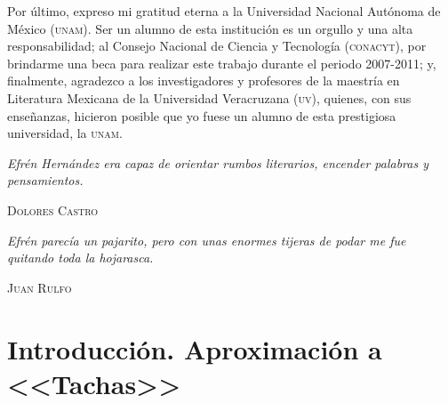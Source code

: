 \documentclass[14pt,twoside,final]{extbook} %
\begin{document}
Por último, expreso mi gratitud eterna a la Universidad Nacional Autónoma de México (\textsc{unam}). Ser un alumno de esta institución es un orgullo y una alta responsabilidad; al Consejo Nacional de Ciencia y Tecnología (\textsc{conacyt}), por brindarme una beca para realizar este trabajo durante el periodo 2007-2011; y, finalmente, agradezco a los investigadores y profesores de la maestría en Literatura Mexicana de la Universidad Veracruzana (\textsc{uv}), quienes, con sus enseñanzas, hicieron posible que yo fuese un alumno de esta prestigiosa universidad, la \textsc{unam}.
\makeatletter
\renewcommand\@dotsep{200}
\makeatother
\renewcommand{\contentsname}{Contenidos}
\tableofcontents
{}
\thispagestyle{empty}
\pagestyle{fancy}
\fancyhf{} %
\fancyhead[RO,LE]{\thepage}
\fancyfoot{}
\renewcommand{\headrulewidth}{0pt}
\setcounter{page}{7}
\newpage
\pagestyle{empty}
\null\vfill
\newpage
\pagestyle{empty}
\vspace*{42pt}
\begin{flushright}
\begin{minipage}{7.5cm} %
\emph{Efrén Hernández era capaz de orientar rumbos literarios, encender palabras y pensamientos.}
\begin{flushright}
\textsc{Dolores Castro}
\end{flushright}
\vspace*{28pt}
\emph{Efrén parecía un pajarito, pero con unas enormes tijeras de podar me fue quitando toda la hojarasca.}
\begin{flushright}
\textsc{Juan Rulfo}
\end{flushright}
\end{minipage}
\end{flushright}
\chapter*{Introducción. Aproximación a <<Tachas>>}\label{ch:introduccion-aproximacion-a-tachas}
\thispagestyle{empty}
\pagestyle{fancy}
\fancyhf{} %
\fancyhead[RO,LE]{\thepage}
\renewcommand{\headrulewidth}{0.4pt}
\setcounter{page}{11}
\end{document}
